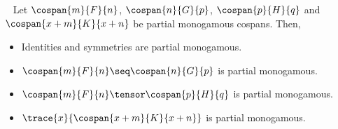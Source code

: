 \begin{lemma}~\label{lem:partial monogamous-ops}
    Let \(\cospan{m}{F}{n}\), \(\cospan{n}{G}{p}\), \(\cospan{p}{H}{q}\) and
    \(\cospan{x+m}{K}{x+n}\) be partial monogamous cospans.
    Then,
    \begin{itemize}
        \item Identities and symmetries are partial monogamous.
        \item \(\cospan{m}{F}{n} \seq \cospan{n}{G}{p}\) is partial monogamous.
        \item \(\cospan{m}{F}{n} \tensor \cospan{p}{H}{q}\) is partial
                monogamous.
        \item \(\trace{x}{\cospan{x+m}{K}{x+n}} \) is partial monogamous.
    \end{itemize}
\end{lemma}

